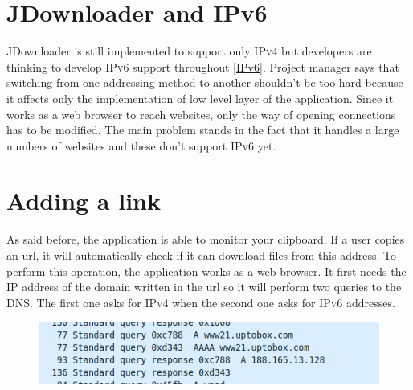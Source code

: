 \documentclass[journal]{IEEEtran}
\begin{document}

\section{JDownloader and IPv6}
 JDownloader is still implemented to support only \textsc{IPv4} but developers are thinking to develop \textsc{IPv6} support throughout \ref{IPv6}. Project manager says that switching from one addressing method to another shouldn't be too hard because it affects only the implementation of low level layer of the application. Since it works as a web browser to reach websites, only the way of opening connections has to be modified. The main problem stands in the fact that it handles a large numbers of websites and these don't support \textsc{IPv6} yet. 


\section{Adding a link}
As said before, the application is able to monitor your clipboard. If a user copies an url, it will automatically check if it can download files from this address. To perform this operation, the application works as a web browser. It first needs the \textsc{IP} address of the domain written in the url so it will perform two queries to the DNS. The first one asks for \textsc{IPv4} when the second one asks for \textsc{IPv6} addresses.  \\
\begin{figure}
\includegraphics[scale=0.4]{dns.png}
\end{figure}
\end{document}
